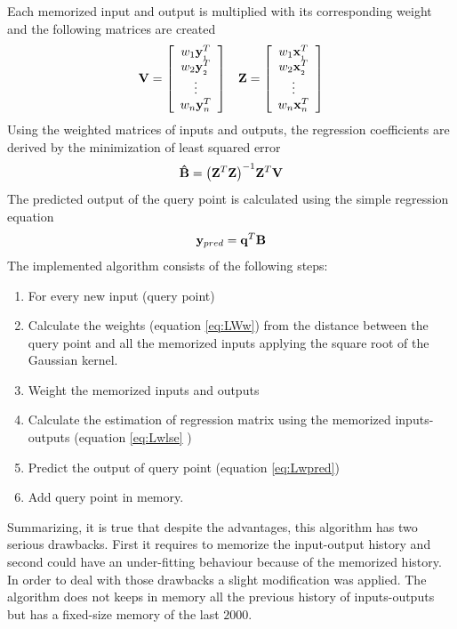 \documentclass[msc,ai,logo]{infthesis}
\begin{document}
Each memorized input and output is multiplied with its corresponding weight and the following matrices are created 
 \[\begin{array}{*{20}{c}}
{{\bf{V}} = \left[ {\begin{array}{*{20}{c}}
{w_1{\bf{y}}_{_1}^T}\\
{w_2{\bf{y}}_{_2}^T}\\
 \vdots \\
{w_n{\bf{y}}_n^T}
\end{array}} \right]}&{{\bf{Z}} = \left[ {\begin{array}{*{20}{c}}
{w_1{\bf{x}}_{_1}^T}\\
{w_2{\bf{x}}_{_2}^T}\\
 \vdots \\
{w_n{\bf{x}}_n^T}
\end{array}} \right]}
\end{array}\]
Using the weighted matrices of inputs and outputs, the regression coefficients are derived by the minimization of least squared error 
\begin{equation}
{\bf{\hat B}} = {\left( {{{\bf{Z}}^T}{\bf{Z}}} \right)^{ - 1}}{{\bf{Z}}^T}{\bf{V}}
\label{eq:Lwlse}
\end{equation}
The predicted output of the query point is calculated using the simple regression equation
\begin{equation}
{{\bf{y}}_{pred} = {\bf{q}}^T\bf{B}}
\label{eq:Lwpred}
\end{equation}
The implemented algorithm consists of the following steps:

\begin{enumerate}
 \item For every new input (query point)
    \item Calculate the weights (equation \ref{eq:LWw}) from the distance between the query point and all the memorized inputs applying the square root of the Gaussian kernel.
    \item Weight the memorized inputs and outputs
    \item Calculate the estimation of regression matrix using the memorized inputs-outputs (equation \ref{eq:Lwlse} )
    \item Predict the output of query point (equation \ref{eq:Lwpred}) 
    \item Add query point in memory.
 \end{enumerate}   
Summarizing, it is true that despite the advantages, this algorithm has two serious drawbacks. First it requires to memorize the input-output history and second could have an under-fitting behaviour because of the memorized history. In order to deal with those drawbacks a slight modification was applied. The algorithm does not keeps in memory all the previous history of inputs-outputs but has a fixed-size memory of the last $2000$. 
\end{document}
